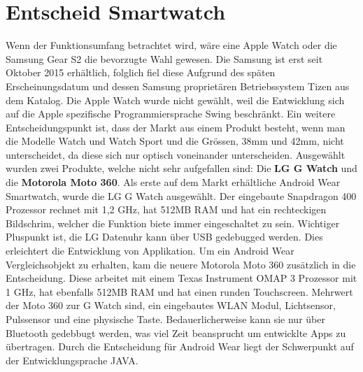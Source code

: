 \section{Entscheid Smartwatch}
Wenn der Funktionsumfang betrachtet wird, wäre eine Apple Watch oder die Samsung Gear S2 die bevorzugte Wahl gewesen. Die Samsung ist erst seit Oktober 2015 erhältlich, folglich fiel diese Aufgrund des späten Erscheinungsdatum und dessen Samsung proprietären Betriebssystem Tizen aus dem Katalog. Die Apple Watch wurde nicht gewählt, weil die Entwicklung sich auf die Apple spezifische Programmiersprache Swing beschränkt. Ein weitere Entscheidungspunkt ist, dass der Markt aus einem Produkt besteht, wenn man die Modelle Watch und Watch Sport und die Grössen, 38mm und 42mm, nicht unterscheidet, da diese sich nur optisch voneinander unterscheiden.
Ausgewählt wurden zwei Produkte, welche nicht sehr aufgefallen sind: Die \textbf{LG G Watch} und die \textbf{Motorola Moto 360}. Als erste auf dem Markt erhältliche Android Wear Smartwatch, wurde die LG G Watch ausgewählt. Der eingebaute Snapdragon 400 Prozessor rechnet mit 1,2 GHz, hat 512MB RAM und hat ein rechteckigen Bildschrim, welcher die Funktion biete immer eingeschaltet zu sein. Wichtiger Pluspunkt ist, die LG Datenuhr kann über USB gedebugged werden. Dies erleichtert die Entwicklung von Applikation. Um ein Android Wear Vergleichsobjekt zu erhalten, kam die neuere Motorola Moto 360 zusätzlich in die Entscheidung. Diese arbeitet mit einem Texas Instrument OMAP 3 Prozessor mit 1 GHz, hat ebenfalls 512MB RAM und hat einen runden Touchscreen. Mehrwert der Moto 360 zur G Watch sind, ein eingebautes WLAN Modul, Lichtsensor, Pulssensor und eine physische Taste. Bedauerlicherweise kann sie nur über Bluetooth gedebbugt werden, was viel Zeit beansprucht um entwicklte Apps zu übertragen. Durch die Entscheidung für Android Wear liegt der Schwerpunkt auf der Entwicklungsprache JAVA.
